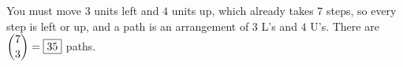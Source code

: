 You must move $3$ units left and $4$ units up, which already takes $7$ steps, so every step is left or up, and a path is an arrangement of $3$ L's and $4$ U's. There are $\dbinom73=\boxed{35}$ paths.
